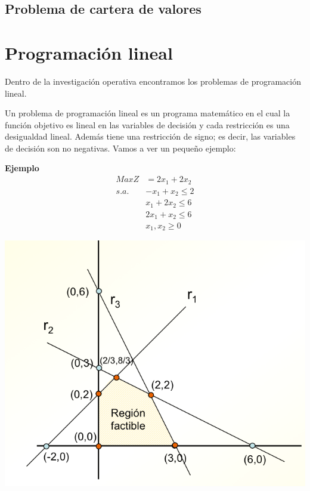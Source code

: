 \documentclass{article}
\begin{document}
\subsection{Problema de cartera de valores}

\section{Programación lineal}
Dentro de la investigación operativa encontramos los problemas de programación lineal.

Un problema de programación lineal es un programa matemático en el cual la función objetivo es lineal en las variables de decisión y cada restricción es una desigualdad lineal. Además tiene una restricción de signo; es decir, las variables de decisión son no negativas. Vamos a ver un pequeño ejemplo:

\textbf{Ejemplo}
\begin{equation}
\begin{split}
MaxZ&=2x_1+2x_2\\
s.a.~&-x_1+x_2\leq 2\\
&x_1+2x_2\leq 6\\
&2x_1+x_2\leq 6\\
&x_1,x_2\geq 0
\end{split}
\end{equation}
\begin{center}
\includegraphics[width=.70\textwidth]{ej_grafi.png} \\
\end{center}
\end{document}
